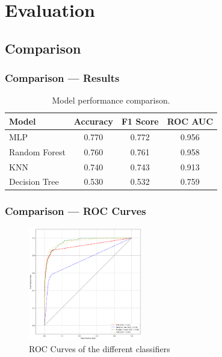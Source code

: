 \documentclass[10pt, aspectratio=169]{beamer}
\begin{document}
\section{Evaluation}
\subsection{Comparison}
\begin{frame}
    \frametitle{Comparison --- Results}
    \begin{table}[h!]
        \centering
        \begin{tabular}{|l|c|c|c|}
        \hline
        \textbf{Model}         & \textbf{Accuracy} & \textbf{F1 Score } & \textbf{ROC AUC } \\ \hline
        MLP                    & 0.770             & 0.772                       & 0.956                   \\ \hline
        Random Forest          & 0.760             & 0.761                       & 0.958                   \\ \hline
        KNN                    & 0.740             & 0.743                       & 0.913                   \\ \hline
        Decision Tree          & 0.530             & 0.532                       & 0.759                   \\ \hline
       
        
        \end{tabular}
        \caption{Model performance comparison.}
        \label{tab:model_performance}
        \end{table}

\end{frame}
\begin{frame}
    \frametitle{Comparison --- ROC Curves}
    \begin{figure}
        \centering
        \includegraphics[width=0.44\textwidth]{img/roc.png}
        \caption{ROC Curves of the different classifiers}
    \end{figure}
\end{frame}
\end{document}
